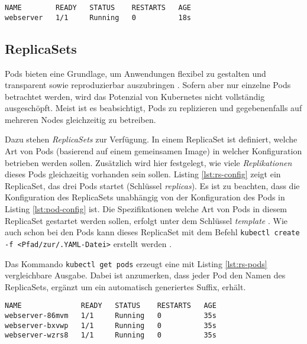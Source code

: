 \documentclass[11pt,a4paper]{article}
\begin{document}
\begin{lstlisting}[caption={Der Pod wurde erfolgreich gestartet.}, label={lst:pod-state}]
NAME        READY   STATUS    RESTARTS   AGE
webserver   1/1     Running   0          18s
\end{lstlisting}

\subsection{ReplicaSets}
Pods bieten eine Grundlage, um Anwendungen flexibel zu gestalten und
transparent sowie reproduzierbar auszubringen \cite{Schmeling_Dargatz_2022}.
Sofern aber nur einzelne Pods betrachtet werden, wird das Potenzial von Kubernetes
nicht vollständig ausgeschöpft.
Meist ist es beabsichtigt, Pods zu replizieren und gegebenenfalls
auf mehreren Nodes gleichzeitig zu betreiben.

Dazu stehen \emph{ReplicaSets} zur Verfügung.
In einem ReplicaSet ist definiert, welche Art von Pods (basierend auf einem gemeinsamen Image)
in welcher Konfiguration betrieben werden sollen. Zusätzlich wird hier festgelegt, wie viele \emph{Replikationen}
dieses Pods gleichzeitig vorhanden sein sollen.
Listing \ref{lst:rs-config} zeigt ein ReplicaSet, das drei Pods startet (Schlüssel \emph{replicas}).
Es ist zu beachten, dass die Konfiguration des ReplicaSets unabhängig von der Konfiguration
des Pods in Listing \ref{lst:pod-config} ist.
Die Spezifikationen welche Art von Pods in diesem ReplicaSet gestartet werden sollen,
erfolgt unter dem Schlüssel \emph{template} \cite{Schmeling_Dargatz_2022}.
Wie auch schon bei den Pods kann dieses ReplicaSet mit dem Befehl
\lstinline|kubectl create -f <Pfad/zur/.YAML-Datei>| erstellt werden \cite{Schmeling_Dargatz_2022}.



Das Kommando \lstinline|kubectl get pods| erzeugt eine mit Listing \ref{lst:rs-pods}
vergleichbare Ausgabe. Dabei ist anzumerken, dass jeder Pod den Namen des ReplicaSets,
ergänzt um ein automatisch generiertes Suffix, erhält.

\begin{lstlisting}[caption={Drei Pods wurden erfolgreich gestartet.}, label={lst:rs-pods}]
NAME              READY   STATUS    RESTARTS   AGE
webserver-86mvm   1/1     Running   0          35s
webserver-bxvwp   1/1     Running   0          35s
webserver-wzrs8   1/1     Running   0          35s
\end{lstlisting}
\end{document}
